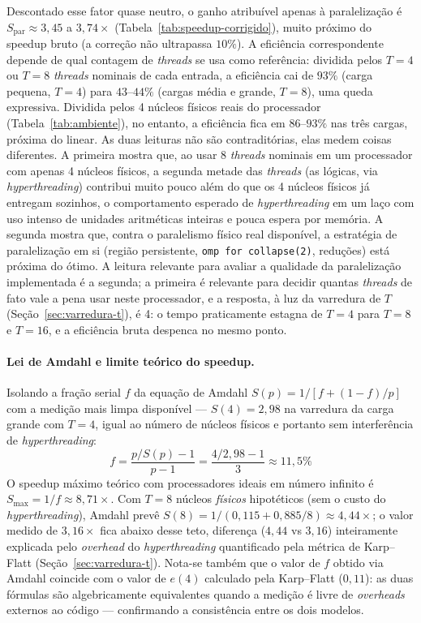 \documentclass[11pt,a4paper]{article}
\begin{document}
Descontado esse fator quase neutro, o ganho atribuível apenas à paralelização é $S_\text{par} \approx 3{,}45$ a $3{,}74\times$ (Tabela~\ref{tab:speedup-corrigido}), muito próximo do speedup bruto (a correção não ultrapassa $10\%$). A eficiência correspondente depende de qual contagem de \emph{threads} se usa como referência: dividida pelos $T=4$ ou $T=8$ \emph{threads} nominais de cada entrada, a eficiência cai de $93\%$ (carga pequena, $T=4$) para $43$--$44\%$ (cargas média e grande, $T=8$), uma queda expressiva. Dividida pelos 4 núcleos físicos reais do processador (Tabela~\ref{tab:ambiente}), no entanto, a eficiência fica em $86$--$93\%$ nas três cargas, próxima do linear. As duas leituras não são contraditórias, elas medem coisas diferentes. A primeira mostra que, ao usar 8 \emph{threads} nominais em um processador com apenas 4 núcleos físicos, a segunda metade das \emph{threads} (as lógicas, via \emph{hyperthreading}) contribui muito pouco além do que os 4 núcleos físicos já entregam sozinhos, o comportamento esperado de \emph{hyperthreading} em um laço com uso intenso de unidades aritméticas inteiras e pouca espera por memória. A segunda mostra que, contra o paralelismo físico real disponível, a estratégia de paralelização em si (região persistente, \texttt{omp for collapse(2)}, reduções) está próxima do ótimo. A leitura relevante para avaliar a qualidade da paralelização implementada é a segunda; a primeira é relevante para decidir quantas \emph{threads} de fato vale a pena usar neste processador, e a resposta, à luz da varredura de $T$ (Seção~\ref{sec:varredura-t}), é 4: o tempo praticamente estagna de $T=4$ para $T=8$ e $T=16$, e a eficiência bruta despenca no mesmo ponto.

\paragraph{Lei de Amdahl e limite teórico do speedup.}
Isolando a fração serial $f$ da equação de Amdahl $S(p) = 1/[f + (1-f)/p]$ com a medição mais limpa disponível --- $S(4) = 2{,}98$ na varredura da carga grande com $T = 4$, igual ao número de núcleos físicos e portanto sem interferência de \emph{hyperthreading}:
\[
  f = \frac{p/S(p) - 1}{p - 1} = \frac{4/2{,}98 - 1}{3} \approx 11{,}5\%
\]
O speedup máximo teórico com processadores ideais em número infinito é $S_\text{max} = 1/f \approx 8{,}71\times$. Com $T = 8$ núcleos \emph{físicos} hipotéticos (sem o custo do \emph{hyperthreading}), Amdahl prevê $S(8) = 1/(0{,}115 + 0{,}885/8) \approx 4{,}44\times$; o valor medido de $3{,}16\times$ fica abaixo desse teto, diferença ($4{,}44$ vs $3{,}16$) inteiramente explicada pelo \emph{overhead} do \emph{hyperthreading} quantificado pela métrica de Karp--Flatt (Seção~\ref{sec:varredura-t}). Nota-se também que o valor de $f$ obtido via Amdahl coincide com o valor de $e(4)$ calculado pela Karp--Flatt ($0{,}11$): as duas fórmulas são algebricamente equivalentes quando a medição é livre de \emph{overheads} externos ao código --- confirmando a consistência entre os dois modelos.
\end{document}
